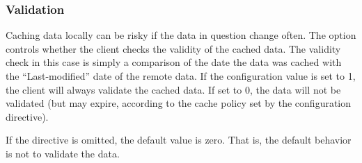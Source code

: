 \begin{description}
\subsubsection{Validation}

Caching data locally can be risky if the data in question change
often.  The  option controls whether the \opendap
client checks the validity of the cached data.  The validity check in
this case is simply a comparison of the date the data was cached with
the ``Last-modified'' date of the remote data.  If the configuration
value is set to 1, the client will always validate the cached data.
If set to 0, the data will not be validated (but may expire, according
to the cache policy set by the  configuration
directive).

If the directive is omitted, the default value is zero.  That is, the
default behavior is not to validate the data.

\end{description}

%
%
%
%
%

